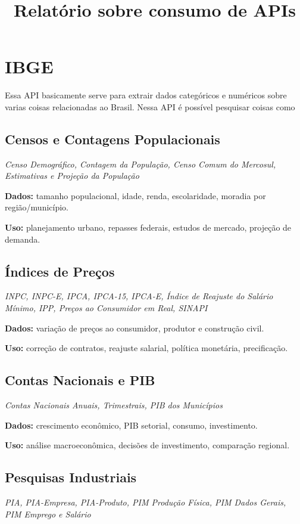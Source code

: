 \documentclass[12pt,a4paper]{article}
\title{\textbf{Relatório sobre consumo de APIs}}
\author{}
\date{}
\begin{document}
\maketitle

\section{IBGE}

Essa API basicamente serve para extrair dados categóricos e numéricos sobre varias coisas relacionadas ao Brasil. Nessa API é possível pesquisar coisas como

\subsection{Censos e Contagens Populacionais}
\textit{Censo Demográfico, Contagem da População, Censo Comum do Mercosul, Estimativas e Projeção da População}

\textbf{Dados:} tamanho populacional, idade, renda, escolaridade, moradia por região/município.

\textbf{Uso:} planejamento urbano, repasses federais, estudos de mercado, projeção de demanda.

\subsection{Índices de Preços}
\textit{INPC, INPC-E, IPCA, IPCA-15, IPCA-E, Índice de Reajuste do Salário Mínimo, IPP, Preços ao Consumidor em Real, SINAPI}

\textbf{Dados:} variação de preços ao consumidor, produtor e construção civil.

\textbf{Uso:} correção de contratos, reajuste salarial, política monetária, precificação.

\subsection{Contas Nacionais e PIB}
\textit{Contas Nacionais Anuais, Trimestrais, PIB dos Municípios}

\textbf{Dados:} crescimento econômico, PIB setorial, consumo, investimento.

\textbf{Uso:} análise macroeconômica, decisões de investimento, comparação regional.

\subsection{Pesquisas Industriais}
\textit{PIA, PIA-Empresa, PIA-Produto, PIM Produção Física, PIM Dados Gerais, PIM Emprego e Salário}
\end{document}
